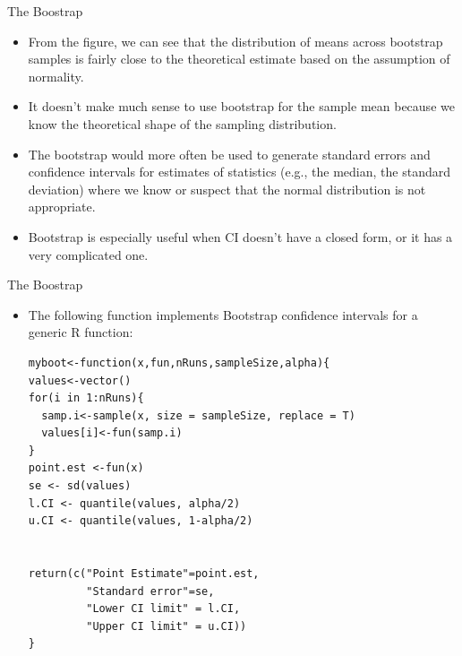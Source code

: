 \documentclass[handout]{beamer}
\begin{document}
\begin{frame}{The Boostrap}
\scriptsize{

\begin{itemize}
\item From the figure, we can see that the distribution of means across bootstrap samples is fairly close to the theoretical estimate based on the assumption of normality. 

\item It doesn't make much sense to use bootstrap for the sample mean because we know the theoretical shape of the sampling distribution.

\item The bootstrap would more often be used to generate standard errors and confidence intervals for estimates of statistics (e.g., the median, the standard deviation) where we know or suspect that the normal distribution is not appropriate. 

\item Bootstrap is especially useful when CI doesn't have a closed form, or it has a very complicated one.


\end{itemize}
}
 
\end{frame}

\begin{frame}[fragile]{The Boostrap}
\scriptsize{

\begin{itemize}
\item The following function implements Bootstrap confidence intervals for a generic R function:

\begin{verbatim}
myboot<-function(x,fun,nRuns,sampleSize,alpha){
values<-vector()
for(i in 1:nRuns){
  samp.i<-sample(x, size = sampleSize, replace = T)
  values[i]<-fun(samp.i)
}
point.est <-fun(x)
se <- sd(values)
l.CI <- quantile(values, alpha/2)
u.CI <- quantile(values, 1-alpha/2)


return(c("Point Estimate"=point.est,
         "Standard error"=se,
         "Lower CI limit" = l.CI,
         "Upper CI limit" = u.CI))
}

\end{verbatim}




\end{itemize}
}
 
\end{frame}
\end{document}
